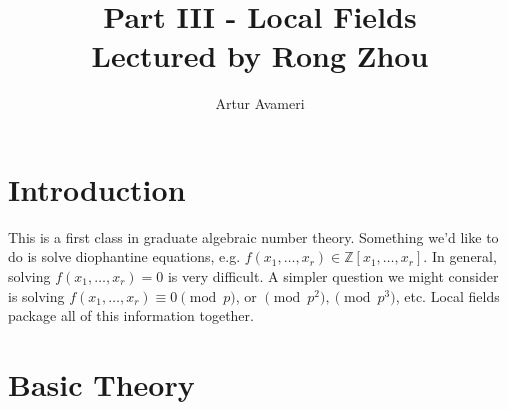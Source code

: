\documentclass{article}
\title{Part III - Local Fields
    \\ \large
    Lectured by Rong Zhou 
}
\author{Artur Avameri}
\date{}
\theoremstyle{definition}
\begin{document}
\maketitle
\tableofcontents
\newpage
 
\section{Introduction}

This is a first class in graduate algebraic number theory. Something we'd like to do is solve diophantine equations, e.g. $f(x_1,\ldots,x_r) \in \mathbb{Z}[x_1,\ldots,x_r]$. In general, solving $f(x_1,\ldots,x_r) = 0$ is very difficult. A simpler question we might consider is solving $f(x_1,\ldots,x_r) \equiv 0 \pmod{p}$, or $\pmod{p^2}, \pmod{p^3}$, etc. Local fields package all of this information together. 

\section{Basic Theory}
\end{document}
